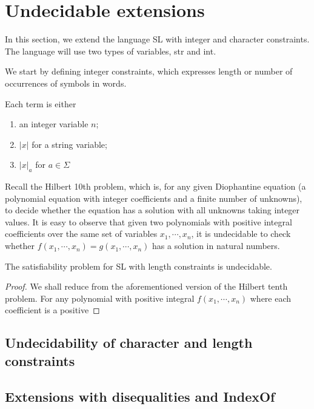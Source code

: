 
\section{Undecidable extensions}

In this section, we extend the language SL with integer and character constraints. The language will use two types of variables, str and int. 

We start by defining integer constraints, which expresses length or number of occurrences of symbols in words. 

\begin{definition}
	Each term is either 
	\begin{enumerate}
		\item an integer variable $n$;
		\item $|x|$ for a string variable;
		\item $|x|_a$ for $a\in \Sigma$
	\end{enumerate}
\end{definition}

Recall the Hilbert 10th problem, which is, for any given Diophantine equation (a polynomial equation with integer coefficients and a finite number of unknowns), to decide whether the equation has a solution with all unknowns taking integer values. It is easy to observe that given two polynomials with positive integral coefficients over the same set of variables $x_1, \cdots, x_n$, it is undecidable to check whether $f(x_1, \cdots, x_n)=g(x_1, \cdots, x_n)$ has a solution in natural numbers. 

\begin{theorem}
	The satisfiability problem for SL with length constraints is undecidable. 
\end{theorem}

\begin{proof}
	We shall reduce from the aforementioned version of the Hilbert tenth problem. For any polynomial with positive integral  $f(x_1, \cdots, x_n)$ where each coefficient is a positive 
\end{proof}

\subsection{Undecidability of character and length constraints}

\subsection{Extensions with disequalities and IndexOf}
